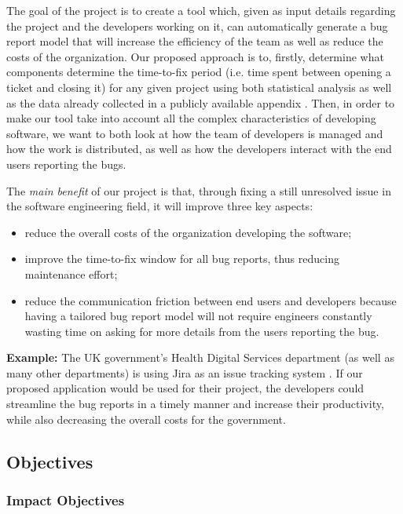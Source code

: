 \documentclass[11pt,english,twocolumn]{article}
\begin{document}
The goal of the project is to create a tool which, given as input details
regarding the project and the developers working on it, can automatically
generate a bug report model that will increase the efficiency of the team
as well as reduce the costs of the organization. Our proposed approach is to,
firstly, determine what components determine the time-to-fix period (i.e. time spent
between opening a ticket and closing it) for any given project using both
statistical analysis as well as the data already collected in a publicly 
available appendix \cite{breu2009appendix}. 
Then, in order to make our tool take into account all the complex characteristics
of developing software, we want to both look at how the team of developers is 
managed and how the work is distributed, as well as how the developers interact
with the end users reporting the bugs.

The \emph{main benefit} of our project is that, through fixing a still
unresolved issue in the software engineering field, it will improve three 
key aspects:

\begin{itemize}
	\item reduce the overall costs of the organization developing the software;
	\item improve the time-to-fix window for all bug reports, thus reducing
	maintenance effort;
	\item reduce the communication friction between end users and developers
	because having a tailored bug report model will not require engineers
	constantly wasting time on asking for more details from the users reporting
	the bug.
\end{itemize}

\textbf{Example:} The UK government's Health Digital Services department (as well
as many other departments) is using Jira as an issue tracking system \cite{gov-uk-jira}. 
If our proposed application would be used for their project, the developers 
could streamline the bug reports in a timely manner and increase their productivity,
while also decreasing the overall costs for the government.

\subsection*{Objectives}

\subsubsection*{Impact Objectives}
\end{document}
